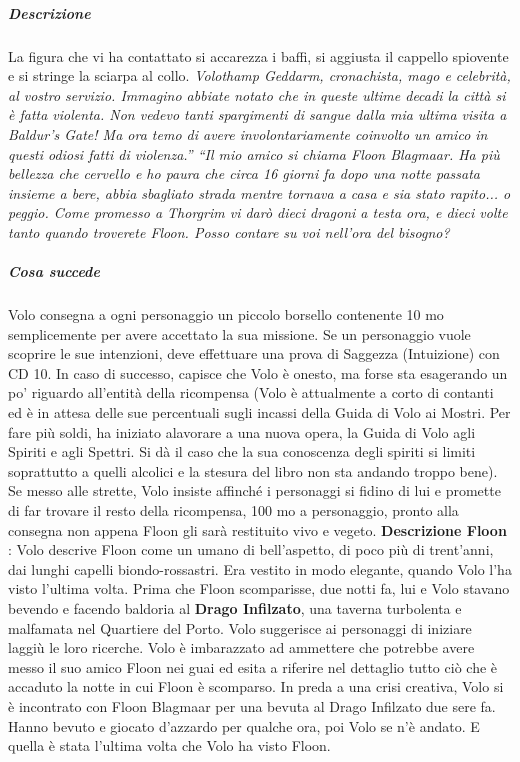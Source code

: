\documentclass{article}
\begin{document}
                        \subparagraph{Descrizione} La figura che vi ha contattato si accarezza i baffi, si
aggiusta il cappello spiovente e si stringe la sciarpa
al collo. \textit{Volothamp Geddarm, cronachista, mago e
celebrità, al vostro servizio. Immagino abbiate notato che
in queste ultime decadi la città si è fatta violenta. Non
vedevo tanti spargimenti di sangue dalla mia ultima visita
a Baldur's Gate! Ma ora temo di avere involontariamente
coinvolto un amico in questi odiosi fatti di violenza.”
“Il mio amico si chiama Floon Blagmaar. Ha più
bellezza che cervello e ho paura che circa 16 giorni fa dopo una notte passata insieme a bere,
abbia sbagliato strada mentre tornava a casa e sia stato
rapito... o peggio. Come promesso a Thorgrim vi darò dieci dragoni a testa ora, e
dieci volte tanto quando troverete Floon. Posso contare
su voi nell'ora del bisogno?}


                        \subparagraph{Cosa succede} Volo consegna a ogni personaggio un piccolo borsello
contenente 10 mo semplicemente per avere accettato
la sua missione. Se un personaggio vuole scoprire le
sue intenzioni, deve effettuare una prova di Saggezza
(Intuizione) con CD 10. In caso di successo, capisce che
Volo è onesto, ma forse sta esagerando un po' riguardo
all'entità della ricompensa (Volo è attualmente a corto di
contanti ed è in attesa delle sue percentuali sugli incassi
della Guida di Volo ai Mostri. Per fare più soldi, ha iniziato
alavorare a una nuova opera, la Guida di Volo agli Spiriti e
agli Spettri. Si dà il caso che la sua conoscenza degli spiriti
si limiti soprattutto a quelli alcolici e la stesura del libro non
sta andando troppo bene). Se messo alle strette, Volo insiste
affinché i personaggi si fidino di lui e promette di far trovare
il resto della ricompensa, 100 mo a personaggio, pronto alla
consegna non appena Floon gli sarà restituito vivo e vegeto.
\textbf{Descrizione Floon} : Volo descrive Floon come un umano di bell'aspetto, di
poco più di trent'anni, dai lunghi capelli biondo-rossastri.
Era vestito in modo elegante, quando Volo l’ha visto l’ultima
volta. Prima che Floon scomparisse, due notti fa, lui e Volo
stavano bevendo e facendo baldoria al \textbf{Drago Infilzato}, una
taverna turbolenta e malfamata nel Quartiere del Porto. Volo
suggerisce ai personaggi di iniziare laggiù le loro ricerche. 
Volo è imbarazzato ad ammettere che potrebbe avere
messo il suo amico Floon nei guai ed esita a riferire nel
dettaglio tutto ciò che è accaduto la notte in cui Floon è
scomparso. In preda a una crisi creativa, Volo si è incontrato con
Floon Blagmaar per una bevuta al Drago Infilzato due sere
fa. Hanno bevuto e giocato d'azzardo per qualche ora, poi
Volo se n'è andato. E quella è stata l'ultima volta che Volo
ha visto Floon.
\end{document}
